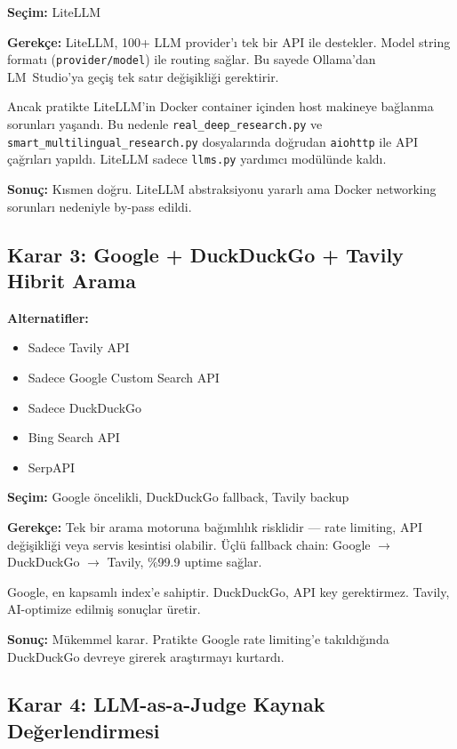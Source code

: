 \textbf{Se\c{c}im:} LiteLLM

\textbf{Gerek\c{c}e:} LiteLLM, 100+ LLM provider'{\i} tek bir API ile destekler. Model string format{\i} (\texttt{provider/model}) ile routing sa\u{g}lar. Bu sayede Ollama'dan LM~Studio'ya ge\c{c}i\c{s} tek sat{\i}r de\u{g}i\c{s}ikli\u{g}i gerektirir.

Ancak pratikte LiteLLM'in Docker container i\c{c}inden host makineye ba\u{g}lanma sorunlar{\i} ya\c{s}and{\i}. Bu nedenle \texttt{real\_deep\_research.py} ve \texttt{smart\_multilingual\_research.py} dosyalar{\i}nda do\u{g}rudan \texttt{aiohttp} ile API \c{c}a\u{g}r{\i}lar{\i} yap{\i}ld{\i}. LiteLLM sadece \texttt{llms.py} yard{\i}mc{\i} mod\"{u}l\"{u}nde kald{\i}.

\textbf{Sonu\c{c}:} K{\i}smen do\u{g}ru. LiteLLM abstraksiyonu yararl{\i} ama Docker networking sorunlar{\i} nedeniyle by-pass edildi.

\subsection{Karar 3: Google + DuckDuckGo + Tavily Hibrit Arama}

\textbf{Alternatifler:}
\begin{itemize}
  \item Sadece Tavily API
  \item Sadece Google Custom Search API
  \item Sadece DuckDuckGo
  \item Bing Search API
  \item SerpAPI
\end{itemize}

\textbf{Se\c{c}im:} Google \"{o}ncelikli, DuckDuckGo fallback, Tavily backup

\textbf{Gerek\c{c}e:} Tek bir arama motoruna ba\u{g}{\i}ml{\i}l{\i}k risklidir --- rate limiting, API de\u{g}i\c{s}ikli\u{g}i veya servis kesintisi olabilir. \"{U}\c{c}l\"{u} fallback chain: Google $\rightarrow$ DuckDuckGo $\rightarrow$ Tavily, \%99.9 uptime sa\u{g}lar.

Google, en kapsaml{\i} index'e sahiptir. DuckDuckGo, API key gerektirmez. Tavily, AI-optimize edilmi\c{s} sonu\c{c}lar \"{u}retir.

\textbf{Sonu\c{c}:} M\"{u}kemmel karar. Pratikte Google rate limiting'e tak{\i}ld{\i}\u{g}{\i}nda DuckDuckGo devreye girerek ara\c{s}t{\i}rmay{\i} kurtard{\i}.

\subsection{Karar 4: LLM-as-a-Judge Kaynak De\u{g}erlendirmesi}

